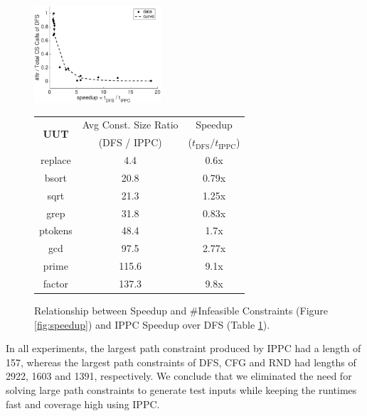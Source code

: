\documentclass[EPiCempty]{easychair}
\begin{document}
\begin{figure}
\centering
\includegraphics[width=0.42\textwidth]{speedup}
\qquad
\setlength{\tabcolsep}{3pt}
\begin{tabular}[b]{|c|cc|}
\hline
\multirow{2}{*}{\textbf{UUT}} & Avg Const. Size Ratio & Speedup \\
                                              & (DFS / IPPC) & ($t_{\text{DFS}} / t_{\text{IPPC}}$) \\
\hline
replace & 4.4 & 0.6x \\
bsort & 20.8 & 0.79x \\
sqrt & 21.3 & 1.25x \\
grep & 31.8 & 0.83x \\
ptokens & 48.4 & 1.7x \\
gcd & 97.5 & 2.77x \\
prime & 115.6 & 9.1x \\
factor & 137.3 & 9.8x \\
\hline
\end{tabular}
\captionsetup{labelformat=andtable}
\caption{Relationship between Speedup and {\#}Infeasible Constraints (Figure \ref{fig:speedup}) and IPPC Speedup over DFS (Table \ref{tbl:speedup}).}\label{fig:speedup}\label{tbl:speedup}
\end{figure}


In all experiments, the largest path constraint produced by IPPC had a length of 157, whereas the largest path constraints of DFS, CFG and RND had lengths of 2922, 1603 and 1391, respectively. We conclude that we eliminated the need for solving large path constraints to generate test inputs while keeping the runtimes fast and coverage high using IPPC.
\end{document}
